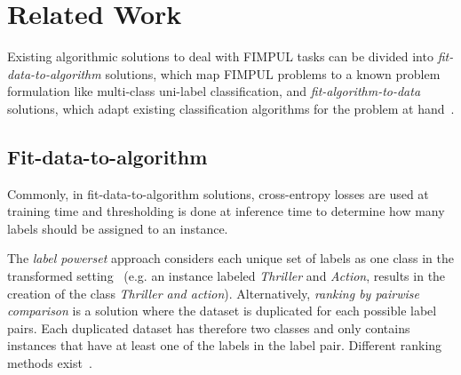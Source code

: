 
\section{Related Work}
\label{sec:org2aceb9f}


Existing algorithmic solutions to deal with FIMPUL tasks can be divided into
\emph{fit-data-to-algorithm} solutions, which map FIMPUL problems to a known
problem formulation like multi-class uni-label classification, and
\emph{fit-algorithm-to-data} solutions, which adapt existing classification
algorithms for the problem at hand~\citep{multilabelMethods}.

\subsection{Fit-data-to-algorithm}
Commonly, in fit-data-to-algorithm solutions, cross-entropy losses are used at
training time and thresholding is done at inference time to determine how many
labels should be assigned to an instance.

The \textit{label powerset} approach considers each unique set of labels as
one class in the transformed setting~\cite{multilabelComparison} (e.g. an
instance labeled \textit{Thriller} and \textit{Action}, results in the
creation of the class \textit{Thriller and action}). Alternatively,
\textit{ranking by pairwise comparison} is a solution where the dataset is
duplicated for each possible label pairs. Each duplicated dataset has
therefore two classes and only contains instances that have at least one of
the labels in the label pair. Different ranking methods
exist~\cite{pairwiseBinary, pairwiseNet}.

